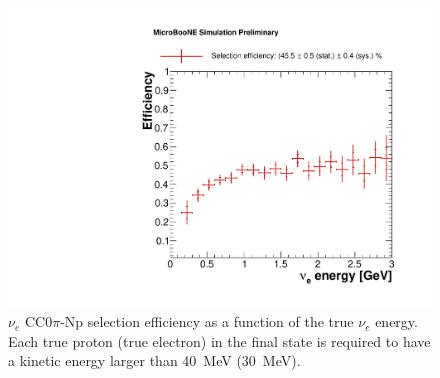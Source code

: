 

\begin{figure}
\centering
    \includegraphics[width=0.8\linewidth]{figures/eff.pdf}
  \caption{$\nu_{e}$ CC$0\pi$-Np selection efficiency as a function of the true $\nu_{e}$ energy. Each true proton (true electron) in the final state is required to have a kinetic energy larger than 40~MeV (30~MeV).}
  \label{fig:effpurity}
\end{figure}

